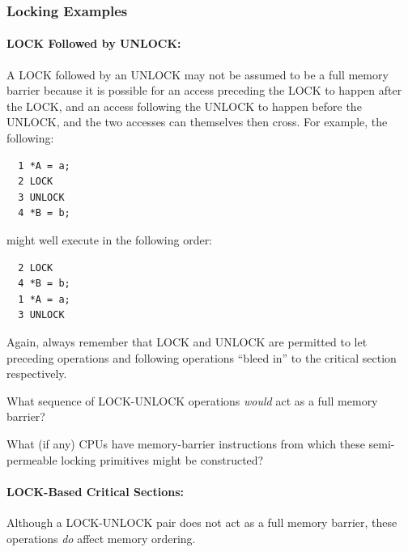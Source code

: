 \subsubsection{Locking Examples}

\paragraph{LOCK Followed by UNLOCK:}
A LOCK followed by an UNLOCK may not be assumed to be a full memory barrier
because it is possible for an access preceding the LOCK to happen after the
LOCK, and an access following the UNLOCK to happen before the UNLOCK, and the
two accesses can themselves then cross.
For example, the following:

\vspace{5pt}
\begin{minipage}[t]{\columnwidth}
\scriptsize
\begin{verbatim}
  1 *A = a;
  2 LOCK
  3 UNLOCK
  4 *B = b;
\end{verbatim}
\end{minipage}
\vspace{5pt}

might well execute in the following order:

\vspace{5pt}
\begin{minipage}[t]{\columnwidth}
\scriptsize
\begin{verbatim}
  2 LOCK
  4 *B = b;
  1 *A = a;
  3 UNLOCK
\end{verbatim}
\end{minipage}
\vspace{5pt}

Again, always remember that LOCK and UNLOCK are permitted to let preceding
operations and following operations ``bleed in'' to the critical section
respectively.

\QuickQuiz{}
	What sequence of LOCK-UNLOCK operations \emph{would}
	act as a full memory barrier?
 \QuickQuizEnd

\QuickQuiz{}
	What (if any) CPUs have memory-barrier instructions
	from which these semi-permeable locking primitives might
	be constructed?
 \QuickQuizEnd

\paragraph{LOCK-Based Critical Sections:}
Although a LOCK-UNLOCK pair does not act as a full memory barrier,
these operations \emph{do} affect memory ordering.

